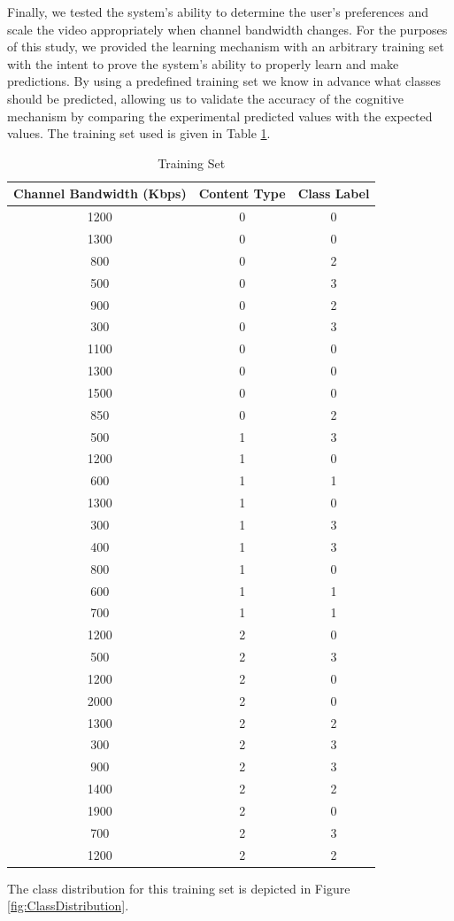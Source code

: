 \documentclass[preprint, 12pt]{elsarticle}
\begin{document}
Finally, we tested the system’s ability to determine the user’s preferences and scale the video appropriately when channel bandwidth changes. For the purposes of this study, we provided the learning mechanism with an arbitrary training set with the intent to prove the system’s ability to properly learn and make predictions. By using a predefined training set we know in advance what classes should be predicted, allowing us to validate the accuracy of the cognitive mechanism by comparing the experimental predicted values with the expected values. The training set used is given in Table \ref{tab:TrainingSet}.
\begin{table} [h]
\caption{Training Set}
\label{tab:TrainingSet}
\begin{tabular}{c|c|c}
\textbf{Channel Bandwidth (Kbps)}&\textbf{Content Type}&\textbf{Class Label}\\
\hline
1200&0&0\\
1300&0&0\\
800&0&2\\
500&0&3\\
900&0&2\\
300&0&3\\
1100&0&0\\
1300&0&0\\
1500&0&0\\
850&0&2\\
500&1&3\\
1200&1&0\\
600&1&1\\
1300&1&0\\
300&1&3\\
400&1&3\\
800&1&0\\
600&1&1\\
700&1&1\\
1200&2&0\\
500&2&3\\
1200&2&0\\
2000&2&0\\
1300&2&2\\
300&2&3\\
900&2&3\\
1400&2&2\\
1900&2&0\\
700&2&3\\
1200&2&2\\
\end{tabular}
\end{table}
The class distribution for this training set is depicted in Figure \ref{fig:ClassDistribution}.
\end{document}
